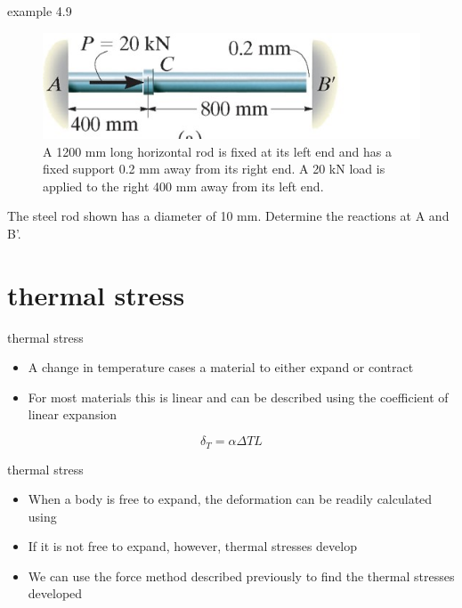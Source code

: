 \documentclass[
  letterpaper,
  ignorenonframetext,
  aspectratio=43,
  handout,
  12pt]{beamer}
\providecommand{\tightlist}{%
  \setlength{\itemsep}{0pt}\setlength{\parskip}{0pt}}
\providecommand{\tightlist}{%
\setlength{\itemsep}{0pt}\setlength{\parskip}{0pt}}
\let\Oldincludegraphics\includegraphics
\renewcommand{\includegraphics}[2][]{\Oldincludegraphics[width=\textwidth,height=0.7\textheight,keepaspectratio]{#2}}
\begin{document}
\begin{frame}{example 4.9}
\protect\hypertarget{example-4.9}{}
\begin{figure}
\centering
\includegraphics{../images/example-4-9.jpg}
\caption{A 1200 mm long horizontal rod is fixed at its left end and has
a fixed support 0.2 mm away from its right end. A 20 kN load is applied
to the right 400 mm away from its left end.}
\end{figure}

The steel rod shown has a diameter of 10 mm. Determine the reactions at
A and B'.
\end{frame}

\hypertarget{thermal-stress}{%
\section{thermal stress}\label{thermal-stress}}

\begin{frame}{thermal stress}
\protect\hypertarget{thermal-stress-1}{}
\begin{itemize}
\tightlist
\item
  A change in temperature cases a material to either expand or contract
\item
  For most materials this is linear and can be described using the
  coefficient of linear expansion
\end{itemize}

\[\delta_T = \alpha \Delta T L\]
\end{frame}

\begin{frame}{thermal stress}
\protect\hypertarget{thermal-stress-2}{}
\begin{itemize}
\tightlist
\item
  When a body is free to expand, the deformation can be readily
  calculated using
\item
  If it is not free to expand, however, thermal stresses develop
\item
  We can use the force method described previously to find the thermal
  stresses developed
\end{itemize}
\end{frame}
\end{document}
